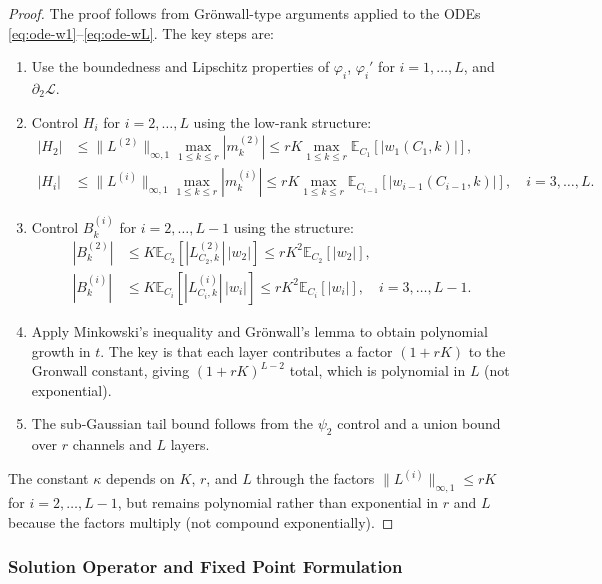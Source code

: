 \documentclass[11pt]{article}
\newcommand{\E}{\mathbb{E}}
\newcommand{\1}{\mathbbm{1}}
\begin{document}
\begin{proof}
The proof follows from Grönwall-type arguments applied to the ODEs \eqref{eq:ode-w1}--\eqref{eq:ode-wL}. The key steps are:
\begin{enumerate}
\item Use the boundedness and Lipschitz properties of $\varphi_i$, $\varphi_i'$ for $i=1,\ldots,L$, and $\partial_2\mathcal{L}$.

\item Control $H_i$ for $i=2,\ldots,L$ using the low-rank structure:
\begin{align*}
|H_2| &\le \|L^{(2)}\|_{\infty,1}\max_{1\le k\le r}|m_k^{(2)}|\le rK\max_{1\le k\le r}\E_{C_1}[|w_1(C_1,k)|],\\
|H_i| &\le \|L^{(i)}\|_{\infty,1}\max_{1\le k\le r}|m_k^{(i)}|\le rK\max_{1\le k\le r}\E_{C_{i-1}}[|w_{i-1}(C_{i-1},k)|], \quad i=3,\ldots,L.
\end{align*}

\item Control $B_k^{(i)}$ for $i=2,\ldots,L-1$ using the structure:
\begin{align*}
|B_k^{(2)}| &\le K\E_{C_2}[|L^{(2)}_{C_2,k}|\,|w_2|]\le rK^2\E_{C_2}[|w_2|],\\
|B_k^{(i)}| &\le K\E_{C_i}[|L^{(i)}_{C_i,k}|\,|w_i|]\le rK^2\E_{C_i}[|w_i|], \quad i=3,\ldots,L-1.
\end{align*}

\item Apply Minkowski's inequality and Grönwall's lemma to obtain polynomial growth in $t$. The key is that each layer contributes a factor $(1+rK)$ to the Gronwall constant, giving $(1+rK)^{L-2}$ total, which is polynomial in $L$ (not exponential).

\item The sub-Gaussian tail bound follows from the $\psi_2$ control and a union bound over $r$ channels and $L$ layers.
\end{enumerate}
The constant $\kappa$ depends on $K$, $r$, and $L$ through the factors $\|L^{(i)}\|_{\infty,1}\le rK$ for $i=2,\ldots,L-1$, but remains polynomial rather than exponential in $r$ and $L$ because the factors multiply (not compound exponentially).
\end{proof}

\subsubsection{Solution Operator and Fixed Point Formulation}
\end{document}
